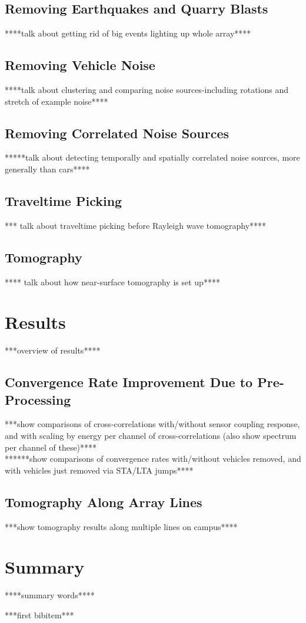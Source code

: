 \documentclass[11pt]{amsart}
\begin{document}
\subsection*{Removing Earthquakes and Quarry Blasts}
****talk about getting rid of big events lighting up whole array****

\subsection*{Removing Vehicle Noise}
****talk about clustering and comparing noise sources-including rotations and stretch of example noise****

\subsection*{Removing Correlated Noise Sources}
*****talk about detecting temporally and spatially correlated noise sources, more generally than cars****

\subsection*{Traveltime Picking}
*** talk about traveltime picking before Rayleigh wave tomography****

\subsection*{Tomography}
**** talk about how near-surface tomography is set up****

\section*{Results}
***overview of results****

\subsection*{Convergence Rate Improvement Due to Pre-Processing}
***show comparisons of cross-correlations with/without sensor coupling response, and with scaling by energy per channel of cross-correlations (also show spectrum per channel of these)****
\\
******show comparisons of convergence rates with/without vehicles removed, and with vehicles just removed via STA/LTA jumps****


\subsection*{Tomography Along Array Lines}
***show tomography results along multiple lines on campus****


\section*{Summary}
****summary words****


\begin{thebibliography}{10}
 ***first bibitem***


\end{thebibliography}
\end{document}
